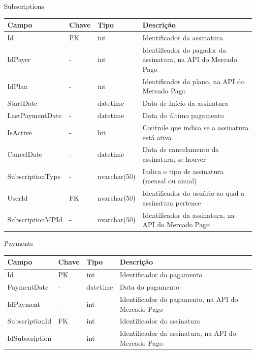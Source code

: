 \begin{apendicesenv}
\begin{quadro}[h!]
\centering
\caption{Subscriptions}
\label{tab:subscriptions}
\begin{longtable}{|p{4cm}|p{2cm}|p{3cm}|p{5cm}|}
\hline
Campo & Chave & Tipo & Descrição
\\\hline
Id & PK & int & Identificador da assinatura
\\\hline
IdPayer & - & int & Identificador do pagador da assinatura, na API do Mercado Pago
\\\hline
IdPlan & - & int & Identificador do plano, na API do Mercado Pago
\\\hline
StartDate & - & datetime & Data de Início da assinatura
\\\hline
LastPaymentDate & - & datetime & Data do último pagamento
\\\hline
IsActive & - & bit & Controle que indica se a assinatura está ativa
\\\hline
CancelDate & - & datetime & Data de cancelamento da assinatura, se houver
\\\hline
SubscriptionType & - & nvarchar(50) & Indica o tipo de assinatura (mensal ou anual)
\\\hline
UserId & FK & nvarchar(50) &Identificador do usuário ao qual a assinatura pertence
\\\hline
SubscriptionMPId & - & nvarchar(50) &Identificador da assinatura, na API do Mercado Pago
\\\hline
\end{longtable}
\end{quadro}

\begin{quadro}[h!]
\centering
\caption{Payments}
\label{tab:payments}
\begin{longtable}{|p{4cm}|p{2cm}|p{3cm}|p{5cm}|}
\hline
Campo & Chave & Tipo & Descrição
\\\hline
Id & PK & int & Identificador do pagamento
\\\hline
PaymentDate & - & datetime & Data do pagamento
\\\hline
IdPayment & - & int & Identificador do pagamento, na API do Mercado Pago
\\\hline
SubscriptionId & FK & int & Identificador da assinatura
\\\hline
IdSubscription & - & int & Identificador da assinatura, na API do Mercado Pago
\\\hline
\end{longtable}
\end{quadro}


\end{apendicesenv}
